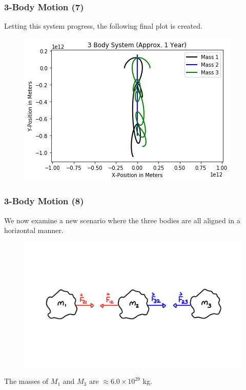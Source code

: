 \documentclass{beamer}
\begin{document}
\begin{frame}
\frametitle{3-Body Motion (7)}
Letting this system progress, the following final plot is created.
\begin{figure}
\begin{center}
\includegraphics[width=0.90\linewidth]{3BodyDynamics15.png}
\end{center}
\end{figure}
\end{frame}
\begin{frame}
\frametitle{3-Body Motion (8)}
We now examine a new scenario where the three bodies are all aligned in a horizontal manner.
\begin{figure}
\begin{center}
\includegraphics[width=0.80\linewidth]{3BodyCartoon3.png}
\end{center}
\end{figure}
The masses of $M_{1}$ and $M_{3}$ are $\approx 6.0\times 10^{29}$ kg.
\end{frame}
\end{document}
